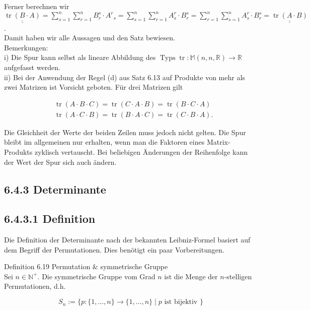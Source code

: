 \documentclass[10pt]{article}
\begin{document}
Ferner berechnen wir\\
$\underline{\underline{\operatorname{tr}(B \cdot A)}}=\sum_{s=1}^{n} \sum_{r=1}^{n} B_{r}^{s} \cdot A^{r}{ }_{s}=\sum_{s=1}^{n} \sum_{r=1}^{n} A_{s}^{r} \cdot B_{r}^{s}=\sum_{r=1}^{n} \sum_{s=1}^{n} A_{s}^{r} \cdot B_{r}^{s}=\underline{\underline{\operatorname{tr}(A \cdot B)}}$.\\
Damit haben wir alle Aussagen und den Satz bewiesen.\\
Bemerkungen:\\
i) Die Spur kann selbst als lineare Abbildung des $\operatorname{Typs} \operatorname{tr}: \mathbb{M}(n, n, \mathbb{R}) \rightarrow \mathbb{R}$ aufgefasst werden.\\
ii) Bei der Anwendung der Regel (d) aus Satz 6.13 auf Produkte von mehr als zwei Matrizen ist Vorsicht geboten. Für drei Matrizen gilt


\begin{align*}
& \operatorname{tr}(A \cdot B \cdot C)=\operatorname{tr}(C \cdot A \cdot B)=\operatorname{tr}(B \cdot C \cdot A)  \tag{6.98}\\
& \operatorname{tr}(A \cdot C \cdot B)=\operatorname{tr}(B \cdot A \cdot C)=\operatorname{tr}(C \cdot B \cdot A) . \tag{6.99}
\end{align*}


Die Gleichheit der Werte der beiden Zeilen muss jedoch nicht gelten. Die Spur bleibt im allgemeinen nur erhalten, wenn man die Faktoren eines Matrix-Produkts zyklisch vertauscht. Bei beliebigen Änderungen der Reihenfolge kann der Wert der Spur sich auch ändern.

\subsection*{6.4.3 Determinante}
\subsection*{6.4.3.1 Definition}
Die Definition der Determinante nach der bekannten Leibniz-Formel basiert auf dem Begriff der Permutationen. Dies benötigt ein paar Vorbereitungen.

Definition 6.19 Permutation \& symmetrische Gruppe\\
Sei $n \in \mathbb{N}^{+}$. Die symmetrische Gruppe vom Grad $n$ ist die Menge der $n$-stelligen Permutationen, d.h.


\begin{equation*}
S_{n}:=\{p:\{1, \ldots, n\} \rightarrow\{1, \ldots, n\} \mid p \text { ist bijektiv }\} \tag{6.100}
\end{equation*}
\end{document}

